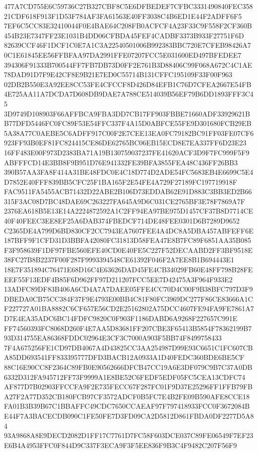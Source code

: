 \documentclass[UTF8,fontset=fandol,zihao=-4,a4paper]{ctexart}
\begin{document}
{{477A7CD755E6C59736C27B327CBF8C5E6DFBEDEF7CFBC3331490840FEC35821CDF618F913F1D53F784AF3FA61563E40FF3038C4B6ED1E44F2ADFF6F5
7EF6C5CC83E32410044F0E4BAE64C208FB0ACFCF4A23F33C9F558F2CF360B454B23E7347FF23E1031B4DD06CFBDA45FEF4CADBF3373B933F27751F6D
82639CCF46F1DCF1C0E7A1C3A22540501006B992383BBC720E7CFEB98426A70C1E61845EE56FFBFAA97DA2991FFE07207FCC5E031600ED497BFEDEE7
394306F91333B700544FF7FB7DB73D0FF2E761B3D88406C99F068A672C4C1AE78DAD91D7F9E42CF8E9B21E7ED0C55714B131CFFC195109F33F00F963
02DB2B550E3A92EE8CC53FE4CFCCF8D426D84EFB1C76D7CFEA2667E54FB4E725AA11A7DCDA7D608DB9DAE7A788CE514039B56EF79B6DD1893FFF3C45
3D9749D108903F66AFFBCA9FBA3DD7CB17FF903FBBE71660ADF33929621BB77DFD5446FC0FC89F53E54FFC337F4A15D0ABFCE55FE9D301680FCB29EB
5A38A77C0AEBE5C6ADFF917C00F2E7CEE13EA0FC79182BC91FF03FE07CF6923FF93B0EF81FC824415CE86DE62765BC06EB15ECD8E7EA337FF6D23E23
16FF483E00F973D2383BA71A19B130759037237FE41620ACF3D9F7FC999F5F9ABFFFCD14E3BB8F9B951D76E941332FE39BFA3855FEA48C436FF26BB3
390B57AA3FA8F414A31BE48FDC0E4C18D774D2ADE54FC5683EB4E6699C5E4D7852E40FFF839BB5CFC25F1BA165F2E54FE4A729F27189FC197719918F
FAC9511FA5455ACB71432D22ABE2B106D73EDDAB62E91D883C3BB3ED2B66315F3AC08D7BC48DAE69C263227FA645A9D6C031CE2765BF3E78F7869A7F
2376EA618B5E13E14A2224872592A1C2FF94EA97BE975D1457CF37B8D7714CE40F40FEEC3EE8EF25A6DAB374FBEDCF714DE48FEE0301D6B7289D9652
C2365DE4A799D6BD830CF2CC7943EA7607FEE4A4DC8A5DBA457ABFEFF6E187BFF9F1CFD31D3BBFA42080FC31813D58FEA47E8B7FC89F6851AA35B085
F3F958639F1DF97FBE560EFE40CD0E40FE5C227F52DECAABD2FF3BF9518E38FC27B8B2237F00F287F9993394548CE61392F046F2A7EE8B1B694443E1
18E7F351894C76471E68D16C4E63626DAD45FE4CB34029FB60E48FF798B28FEEEF55F13EDF4B85F6D962FF97D211207FCC5EE7D42475A3F964F933E2
13ADFC89DF83B406A6CD4A7A7DAEE05FFE4CC70D4C00F9B38BFC797D3F9DBEDA0CB75CC384F37F9E4793E00BB4C81F80FC3969DC277F86CE83666A1C
F227727A01BA8882C6CF657E56CD2E25162802A75DCC4607FE94FA9FE7861A7D7E4EA35ADC6BC14FDFC9820C0F903F1186DABD6A9268F227657C991E
FF74560393FC8068D260F4E7AA5D83681FF207CBE3F65413B5854F78362199B793D314755EA86368FDDC02964E3CF3C7000A903F5BB74F8499758433
7F4A675256FE1CD97DB4067A4D43825CC3AA254987D99E93C6651C1FC607CBA85DD693541FF833395777DFD3BACB12A0933A1D40FEDC360BDE6BE5CF
88C16E90CC8F2364C89FB0E90562666DFCB47CC19A6E3DF079C9B7C37A0DB6332D312FA945712FF73F9999A1E8BE52C6FEDF5EDF05FC5CEA13CDFC74
AF877D7B02903FFCCFA9F2E735FECC67F287FC01F9D37E25296FF1FFB79FBA27F2A77D352CB180FCB97CF3572ADCF0B5FC7E4B2FE09B590AFE8CCE18
FA01B3B39B67C1BBAFFC49CDC7650CCAEAF97F797418933FCC0F3672084BE44F7A3BACECDB090C1FE50FE7D3FD09CA2D5812D861FBDA0DF2277D5A84
93A9868A8E9DECD2082D1FF17C7761D7FC58F603DCE037C89FE06549F7EF23E6B4A4953FFC0F844D9C337F3ECA9F3F5EE836F9B3C4F9482C207F56F9
}}
\end{document}
